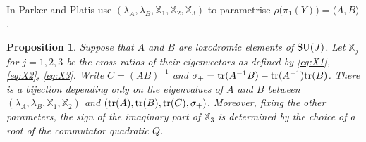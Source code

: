 \documentclass[11pt]{amsart}
\newtheorem{proposition}[theorem]{Proposition}
\numberwithin{equation}{section}
\begin{document}
In \cite{PP} Parker and Platis use $(\lambda_A,\lambda_B,{\mathbb X}_1,{\mathbb X}_2,{\mathbb X}_3)$ to 
parametrise $\rho\bigl(\pi_1(Y)\bigr)=\langle A,B\rangle$.

\begin{proposition}
Suppose that $A$ and $B$ are loxodromic elements of ${\rm SU}(J)$. 
Let ${\mathbb X}_j$ for $j=1,2,3$ be the
cross-ratios of their eigenvectors as defined by \eqref{eq:X1}, \eqref{eq:X2}, \eqref{eq:X3}. Write $C=(AB)^{-1}$ and 
$\sigma_+={\rm tr}(A^{-1}B)-{\rm tr}(A^{-1}){\rm tr}(B)$. 
There is a bijection depending only on the eigenvalues of $A$ and $B$ between 
$(\lambda_A,\lambda_B,{\mathbb X}_1,{\mathbb X}_2)$ and $({\rm tr}(A),{\rm tr}(B),{\rm tr}(C),\sigma_+)$. 
Moreover, fixing the other parameters,
the sign of the imaginary part of ${\mathbb X}_3$ is determined by the choice of a root of the commutator quadratic $Q$.
\end{proposition}
\end{document}
